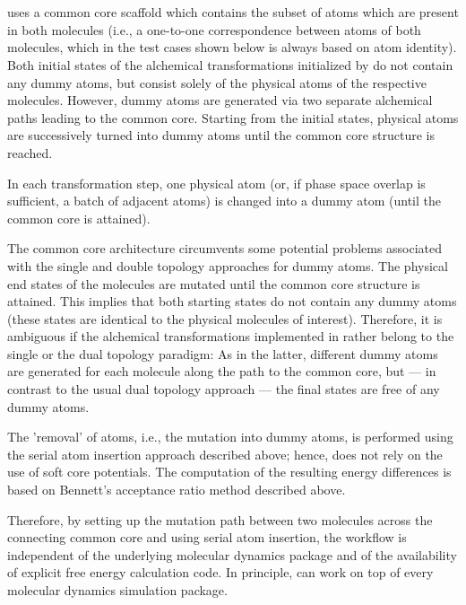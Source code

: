 \chapter{{\trafo} }

{\trafo} uses a common core scaffold which contains the subset of atoms which are present in both molecules (i.e., a one-to-one correspondence between
atoms of both molecules, which in the test cases shown below is always
based on atom identity). Both initial states of the alchemical transformations initialized by {\trafo} do not contain any dummy atoms, but consist solely of the physical atoms of the respective molecules. However, dummy atoms are generated via two separate alchemical paths leading to the common core. Starting from the initial states, physical atoms are successively turned into dummy atoms until the common core structure is reached. 

In each transformation step, one physical atom (or, if phase space
overlap is sufficient, a batch of adjacent atoms) is changed into
a dummy atom (until the common core is attained).

The common core architecture circumvents some potential problems
associated with the single and double topology approaches for dummy
atoms. The physical end states of the molecules are mutated until the
common core structure is attained. This implies that both starting states
do not contain any dummy atoms (these states are identical to the
physical molecules of interest). Therefore, it is ambiguous if the
alchemical transformations implemented in {\trafo} rather belong
to the single or the dual topology paradigm: As in the latter, different
dummy atoms are generated for each molecule along the path to the
common core, but --- in contrast to the usual dual topology approach
--- the final states are free of any dummy atoms. 

The 'removal' of atoms, i.e., the mutation into dummy atoms, is performed
using the serial atom insertion approach described above; hence, {\trafo}
does not rely on the use of soft core potentials. The computation
of the resulting energy differences is based on Bennett's acceptance
ratio method described above.

Therefore, by setting up the mutation path between two molecules across
the connecting common core and using serial atom
insertion, the {\trafo} workflow is independent of the underlying
molecular dynamics package and of the availability of explicit free energy
calculation code. In principle, {\trafo} can work on top of every
molecular dynamics simulation package.

